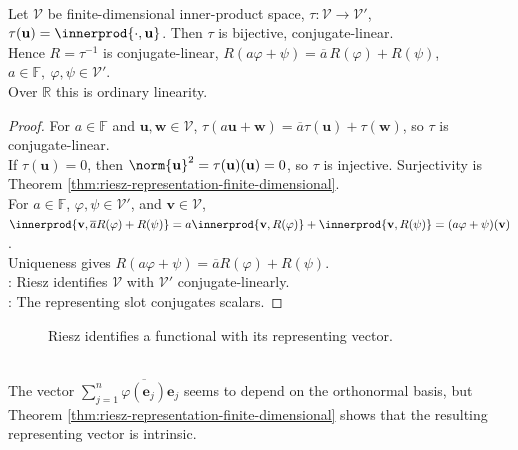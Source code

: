 \begin{theorem} \label{thm:riesz-map-conjugate-isomorphism} \\
Let $\mathcal{V}$ be finite-dimensional inner-product space, $\tau:\mathcal{V}\to\mathcal{V}'$, $\tau(\mathbf{u})=\innerprod{\cdot,\mathbf{u}}$. Then $\tau$ is bijective, conjugate-linear.\\
Hence $R=\tau^{-1}$ is conjugate-linear, $R(a\varphi+\psi)=\overline{a}\,R(\varphi)+R(\psi)$, $a\in\mathbb{F},\ \varphi,\psi\in\mathcal{V}'$.\\
Over $\mathbb{R}$ this is ordinary linearity.
\begin{proof}
For $a\in\mathbb{F}$ and $\mathbf{u},\mathbf{w}\in\mathcal{V}$, $\tau(a\mathbf{u}+\mathbf{w}) =\overline{a}\tau(\mathbf{u})+\tau(\mathbf{w})$, so $\tau$ is conjugate-linear.\\
If $\tau(\mathbf{u})=0$, then $\norm{\mathbf{u}}^2=\tau(\mathbf{u})(\mathbf{u})=0$, so $\tau$ is injective. Surjectivity is Theorem \ref{thm:riesz-representation-finite-dimensional}.\\
For $a\in\mathbb{F}$, $\varphi,\psi\in\mathcal{V}'$, and $\mathbf{v}\in\mathcal{V}$, $\innerprod{\mathbf{v},\overline{a}R(\varphi)+R(\psi)} =a\innerprod{\mathbf{v},R(\varphi)}+\innerprod{\mathbf{v},R(\psi)} =(a\varphi+\psi)(\mathbf{v})$.\\
Uniqueness gives $R(a\varphi+\psi)=\overline{a}R(\varphi)+R(\psi)$.\\
: Riesz identifies $\mathcal{V}$ with $\mathcal{V}'$ conjugate-linearly.\\
: The representing slot conjugates scalars.
\end{proof}
\end{theorem}

\begin{figure}[H]
  \centering
  
  \caption{Riesz identifies a functional with its representing vector.}
  \label{fig:riesz-representation-vector-functional}
\end{figure}

\begin{perspective} \label{per:riesz-representation-coordinates} \\
The vector $\sum_{j=1}^{n}\overline{\varphi(\mathbf{e}_j)}\mathbf{e}_j$ seems to depend on the orthonormal basis, but Theorem \ref{thm:riesz-representation-finite-dimensional} shows that the resulting representing vector is intrinsic.
\end{perspective}
